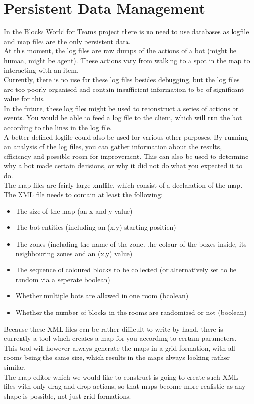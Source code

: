 \section{Persistent Data Management}
In the Blocks World for Teams project there is no need to use databases as \gls{logfile} and map files are the only persistent data.\\

At this moment, the log files are raw dumps of the actions of a bot (might be human, might be agent). These actions vary from walking to a spot in the map to interacting with an item. \\
Currently, there is no use for these log files besides \gls{debugging}, but the log files are too poorly organised and contain insufficient information to be of significant value for this. \\
In the future, these log files might be used to reconstruct a series of actions or events. You would be able to feed a log file to the client, which will run the bot according to the lines in the log file. \\
A better defined logfile could also be used for various other purposes. By running an analysis of the log files, you can gather information about the results, efficiency and possible room for improvement. This can also be used to determine why a bot made certain decisions, or why it did not do what you expected it to do. \\

The map files are fairly large \gls{xmlfile}, which consist of a declaration of the map. \\
The XML file needs to contain at least the following:
\begin{itemize}
\item The size of the map (an x and y value)
\item The bot entities (including an (x,y) starting position)
\item The zones (including the name of the zone, the colour of the boxes inside, its neighbouring zones and an (x,y) value)
\item The sequence of coloured blocks to be collected (or alternatively set to be random via a seperate boolean)
\item Whether multiple bots are allowed in one room (boolean)
\item Whether the number of blocks in the rooms are randomized or not (boolean)
\end{itemize}

Because these XML files can be rather difficult to write by hand, there is currently a tool which creates a map for you according to certain parameters. This tool will however always generate the maps in a grid formation, with all rooms being the same size, which results in the maps always looking rather similar. \\
The map editor which we would like to construct is going to create such XML files with only drag and drop actions, so that maps become more realistic as any shape is possible, not just grid formations.